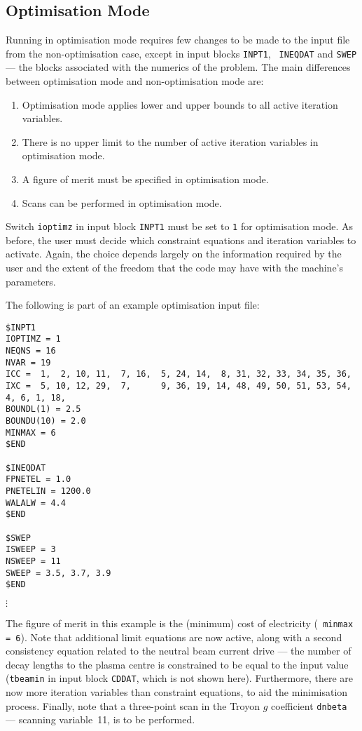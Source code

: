 \subsection{Optimisation Mode}
\label{sec:optim}
Running \PS in optimisation mode requires few changes to be made to the input
file from the non-optimisation case, except in input blocks {\tt INPT1}, {\tt
INEQDAT} and {\tt SWEP} --- the blocks associated with the numerics of the
problem. The main differences between optimisation mode and non-optimisation
mode are:
\begin{enumerate}
\item
Optimisation mode applies lower and upper bounds to all active iteration
variables.
\item
There is no upper limit to the number of active iteration variables in
optimisation mode.
\item
A figure of merit must be specified in optimisation mode.
\item
Scans can be performed in optimisation mode.
\end{enumerate}

Switch {\tt ioptimz} in input block {\tt INPT1} must be set to {\tt 1} for
optimisation mode. As before, the user must decide which constraint equations
and iteration variables to activate. Again, the choice depends largely on the
information required by the user and the extent of the freedom that the code
may have with the machine's parameters.

The following is part of an example optimisation input file:
\begin{verbatim}
$INPT1
IOPTIMZ = 1
NEQNS = 16
NVAR = 19
ICC =  1,  2, 10, 11,  7, 16,  5, 24, 14,  8, 31, 32, 33, 34, 35, 36,
IXC =  5, 10, 12, 29,  7,      9, 36, 19, 14, 48, 49, 50, 51, 53, 54,
4, 6, 1, 18,
BOUNDL(1) = 2.5
BOUNDU(10) = 2.0
MINMAX = 6
$END

$INEQDAT
FPNETEL = 1.0
PNETELIN = 1200.0
WALALW = 4.4
$END

$SWEP
ISWEEP = 3
NSWEEP = 11
SWEEP = 3.5, 3.7, 3.9
$END
\end{verbatim}
\vspace{-8mm}
$\vdots$

The figure of merit in this example is the (minimum) cost of electricity ({\tt
minmax = 6}). Note that additional limit equations are now active, along with
a second consistency equation related to the neutral beam current drive ---
the number of decay lengths to the plasma centre is constrained to be equal to
the input value ({\tt tbeamin} in input block {\tt CDDAT}, which is not shown
here).  Furthermore, there are now more iteration variables than constraint
equations, to aid the minimisation process.  Finally, note that a three-point
scan in the Troyon $g$ coefficient {\tt dnbeta} --- scanning variable~11, is
to be performed.

